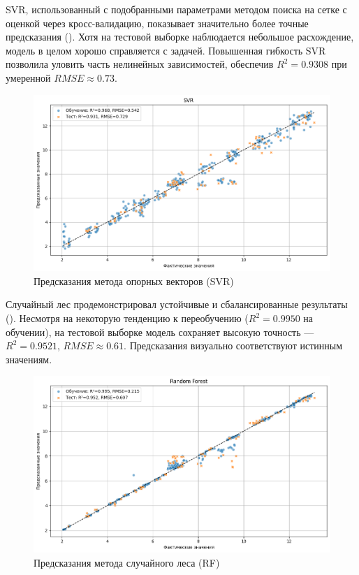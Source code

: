 SVR, использованный с подобранными параметрами методом поиска на сетке с оценкой через кросс-валидацию, показывает значительно более точные предсказания (). Хотя на тестовой выборке наблюдается небольшое расхождение, модель в целом хорошо справляется с задачей. Повышенная гибкость SVR позволила уловить часть нелинейных зависимостей, обеспечив $R^2 = 0.9308$ при умеренной $RMSE \approx 0.73$.

\begin{figure}[htbp!]
	\centering
	\includegraphics[width=.9\linewidth]{my_folder/images/coverage/SVR.png}
	\caption{Предсказания метода опорных векторов (SVR)} 
	\label{fig:coverage-svr}  
\end{figure}

Случайный лес продемонстрировал устойчивые и сбалансированные результаты (). Несмотря на некоторую тенденцию к переобучению ($R^2 = 0.9950$ на обучении), на тестовой выборке модель сохраняет высокую точность --- $R^2 = 0.9521$, $RMSE \approx 0.61$. Предсказания визуально соответствуют истинным значениям.

\begin{figure}[htbp!]
	\centering
	\includegraphics[width=.9\linewidth]{my_folder/images/coverage/Random-Forest.png}
	\caption{Предсказания метода случайного леса (RF)} 
	\label{fig:coverage-rf}  
\end{figure}

